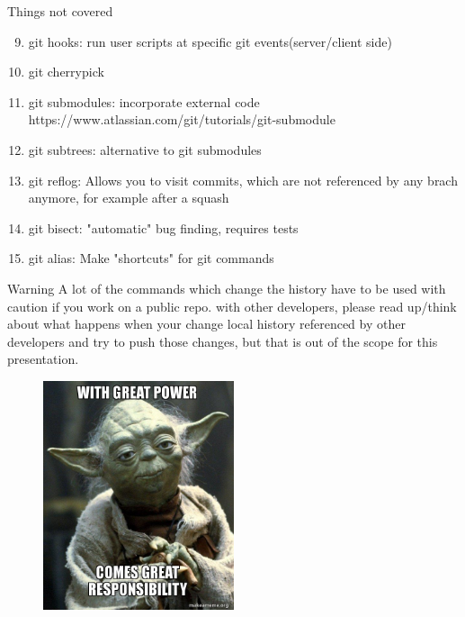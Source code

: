 \documentclass{beamer}
\begin{document}
\begin{frame}[fragile,t]{Things not covered}\vspace{10pt}
  \begin{enumerate}
      \setcounter{enumi}{8}
    \item git hooks: run user scripts at specific git events(server/client side)
    \item git cherrypick
    \item git submodules: incorporate external code https://www.atlassian.com/git/tutorials/git-submodule
    \item git subtrees: alternative to git submodules
    \item git reflog: Allows you to visit commits, which are not referenced by any brach anymore, for example after a squash
    \item git bisect:  "automatic" bug finding, requires tests
    \item git alias: Make "shortcuts" for git commands
  \end{enumerate}
\end{frame}


\begin{frame}[fragile,t]{Warning}\vspace{10pt}
  A lot of the commands which change the history have to be used with caution if you work on a public repo. with other developers, please read up/think about what happens when your change local history referenced by other developers and try to push those changes, but that is out of the scope for this presentation.
  \begin{figure}
      \centering
      \includegraphics[width=0.5\textwidth,height=0.5\textheight]{memes/with-great-power.jpg}

  \end{figure}
\end{frame}
\end{document}
